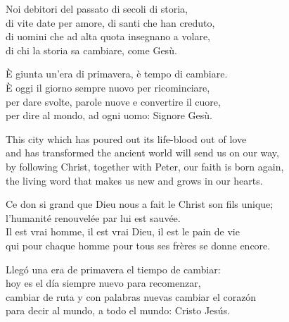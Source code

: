 \spazio


\spazio

\strofa Noi debitori del passato di secoli di storia,\\
di vite date per amore, di santi che han creduto,\\
di uomini che ad alta quota insegnano a volare,\\
di chi la storia sa cambiare, come Gesù.

\spazio


\spazio

\strofa È giunta un'era di primavera, è tempo di cambiare.\\
È oggi il giorno sempre nuovo per ricominciare,\\
per dare svolte, parole nuove e convertire il cuore,\\
per dire al mondo, ad ogni uomo: Signore Gesù.

\spazio


\spazio

\strofa This city which has poured out its life-blood out of love\\
and has transformed the ancient world will send us on our way,\\
by following Christ, together with Peter, our faith is born again,\\
the living word that makes us new and grows in our hearts.

\spazio

\strofa Ce don si grand que Dieu nous a fait le Christ son fils unique;\\
l'humanité renouvelée par lui est sauvée.\\
Il est vrai homme, il est vrai Dieu, il est le pain de vie\\
qui pour chaque homme pour tous ses frères se donne encore.

\spazio

\strofa Llegó una era de primavera el tiempo de cambiar:\\
hoy es el día siempre nuevo para recomenzar,\\
cambiar de ruta y con palabras nuevas cambiar el corazón\\
para decir al mundo, a todo el mundo: Cristo Jesús.

\spazio

